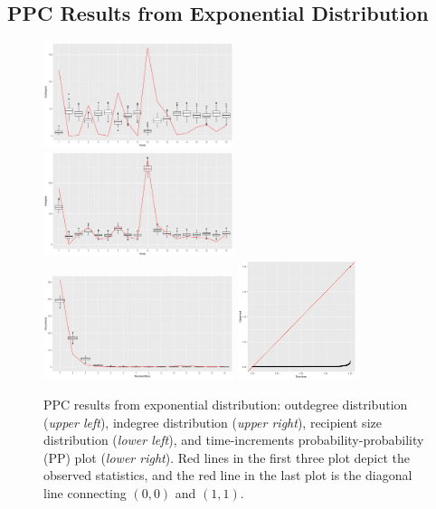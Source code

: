 \documentclass[12pt]{article}
\begin{document}
\begin{appendices}
 \section{PPC Results from Exponential Distribution}\label{sec: PPCexp}
 	\begin{figure}[H]
 		\centering
 		\includegraphics[width=0.495\textwidth]{plots_paper/outdegree_exp-1.png}	
 		\includegraphics[width=0.495\textwidth]{plots_paper/indegree_exp-1.png}	
 		\includegraphics[width=0.495\textwidth]{plots_paper/recipientsize_exp-1.png}	
 		\includegraphics[width=0.31\textwidth]{plots_paper/timepp_exp-1.png}
 		\caption {PPC results from exponential distribution: outdegree distribution (\textit{upper left}), indegree distribution (\textit{upper right}), recipient size distribution (\textit{lower left}), and time-increments probability-probability (PP) plot  (\textit{lower right}). Red lines in the first three plot depict the observed statistics, and the red line in the last plot is the diagonal line connecting $(0, 0)$ and $(1, 1)$.}
 		\label{figure:PPCexp}
 	\end{figure}
	\end{appendices}
\end{document}

